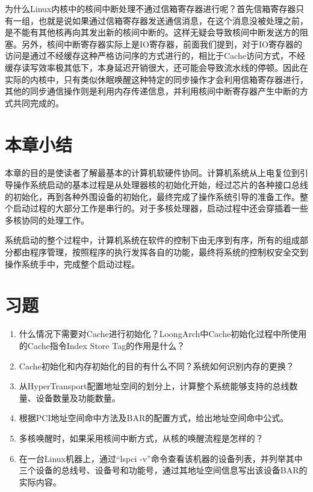 \documentclass[]{ctexbook}
\providecommand{\tightlist}{%
  \setlength{\itemsep}{0pt}\setlength{\parskip}{0pt}}
\begin{document}
为什么Linux内核中的核间中断处理不通过信箱寄存器进行呢？首先信箱寄存器只有一组，也就是说如果通过信箱寄存器发送通信消息，在这个消息没被处理之前，是不能有其他核再向其发出新的核间中断的。这样无疑会导致核间中断发送方的阻塞。另外，核间中断寄存器实际上是IO寄存器，前面我们提到，对于IO寄存器的访问是通过不经缓存这种严格访问序的方式进行的，相比于Cache访问方式，不经缓存读写效率极其低下，本身延迟开销很大，还可能会导致流水线的停顿。因此在实际的内核中，只有类似休眠唤醒这种特定的同步操作才会利用信箱寄存器进行，其他的同步通信操作则是利用内存传递信息，并利用核间中断寄存器产生中断的方式共同完成的。

\hypertarget{ux672cux7ae0ux5c0fux7ed3-6}{%
\section{本章小结}\label{ux672cux7ae0ux5c0fux7ed3-6}}

本章的目的是使读者了解最基本的计算机软硬件协同。计算机系统从上电复位到引导操作系统启动的基本过程是从处理器核的初始化开始，经过芯片的各种接口总线的初始化，再到各种外围设备的初始化，最终完成了操作系统引导的准备工作。整个启动过程的大部分工作是串行的。对于多核处理器，启动过程中还会穿插着一些多核协同的处理工作。

系统启动的整个过程中，计算机系统在软件的控制下由无序到有序，所有的组成部分都由程序管理，按照程序的执行发挥各自的功能，最终将系统的控制权安全交到操作系统手中，完成整个启动过程。

\hypertarget{ux4e60ux9898-6}{%
\section{习题}\label{ux4e60ux9898-6}}

\begin{enumerate}
\def\labelenumi{\arabic{enumi}.}
\tightlist
\item
  什么情况下需要对Cache进行初始化？LoongArch中Cache初始化过程中所使用的Cache指令Index Store Tag的作用是什么？
\item
  Cache初始化和内存初始化的目的有什么不同？系统如何识别内存的更换？
\item
  从HyperTransport配置地址空间的划分上，计算整个系统能够支持的总线数量、设备数量及功能数量。
\item
  根据PCI地址空间命中方法及BAR的配置方式，给出地址空间命中公式。
\item
  多核唤醒时，如果采用核间中断方式，从核的唤醒流程是怎样的？
\item
  在一台Linux机器上，通过``lspci -v''命令查看该机器的设备列表，并列举其中三个设备的总线号、设备号和功能号，通过其地址空间信息写出该设备BAR的实际内容。
\end{enumerate}
\end{document}
